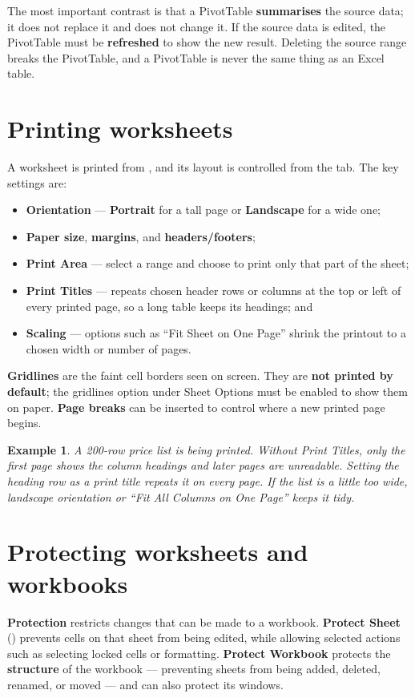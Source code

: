 \documentclass[11pt]{article}
\newtheorem{example}{Example}[section]
\begin{document}
The most important contrast is that a PivotTable \textbf{summarises} the source
data; it does not replace it and does not change it. If the source data is
edited, the PivotTable must be \textbf{refreshed} to show the new result.
Deleting the source range breaks the PivotTable, and a PivotTable is never the
same thing as an Excel table.

\section{Printing worksheets}
A worksheet is printed from , and its layout is controlled
from the  tab. The key settings are:
\begin{itemize}
  \item \textbf{Orientation} --- \textbf{Portrait} for a tall page or
    \textbf{Landscape} for a wide one;
  \item \textbf{Paper size}, \textbf{margins}, and \textbf{headers/footers};
  \item \textbf{Print Area} --- select a range and choose 
    to print only that part of the sheet;
  \item \textbf{Print Titles} --- repeats chosen header rows or columns at the
    top or left of every printed page, so a long table keeps its headings; and
  \item \textbf{Scaling} --- options such as ``Fit Sheet on One Page'' shrink
    the printout to a chosen width or number of pages.
\end{itemize}
\textbf{Gridlines} are the faint cell borders seen on screen. They are
\textbf{not printed by default}; the  gridlines option under Sheet
Options must be enabled to show them on paper. \textbf{Page breaks} can be
inserted to control where a new printed page begins.

\begin{example}
A 200-row price list is being printed. Without Print Titles, only the first page
shows the column headings and later pages are unreadable. Setting the heading
row as a print title repeats it on every page. If the list is a little too wide,
landscape orientation or ``Fit All Columns on One Page'' keeps it tidy.
\end{example}

\section{Protecting worksheets and workbooks}
\textbf{Protection} restricts changes that can be made to a workbook.
\textbf{Protect Sheet} () prevents cells on that
sheet from being edited, while allowing selected actions such as selecting
locked cells or formatting. \textbf{Protect Workbook} protects the
\textbf{structure} of the workbook --- preventing sheets from being added,
deleted, renamed, or moved --- and can also protect its windows.
\end{document}
